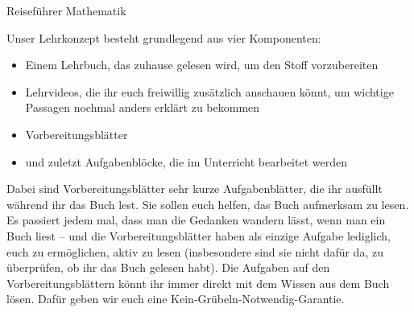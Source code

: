 \documentclass[handout, aspectratio=169, 10pt, ngerman]{beamer}
\begin{document}
\begin{frame}{Reiseführer Mathematik}
{        
        Unser Lehrkonzept besteht grundlegend aus vier Komponenten:
        \begin{itemize}
            \item Einem Lehrbuch, das zuhause gelesen wird, um den Stoff vorzubereiten
            \item Lehrvideos, die ihr euch freiwillig zusätzlich anschauen könnt, um wichtige Passagen nochmal anders erklärt zu bekommen
            \item Vorbereitungsblätter
            \item und zuletzt Aufgabenblöcke, die im Unterricht bearbeitet werden
        \end{itemize}
        Dabei sind Vorbereitungsblätter sehr kurze Aufgabenblätter, die ihr ausfüllt während ihr das Buch lest. Sie sollen euch helfen, das Buch aufmerksam zu lesen. Es passiert jedem mal, dass man die Gedanken wandern lässt, wenn man ein Buch liest -- und die Vorbereitungsblätter haben als einzige Aufgabe lediglich, euch zu ermöglichen, aktiv zu lesen (insbesondere sind sie nicht dafür da, zu überprüfen, ob ihr das Buch gelesen habt). Die Aufgaben auf den Vorbereitungsblättern könnt ihr immer direkt mit dem Wissen aus dem Buch lösen. Dafür geben wir euch eine Kein-Grübeln-Notwendig-Garantie.
    }
\end{frame}
\end{document}

